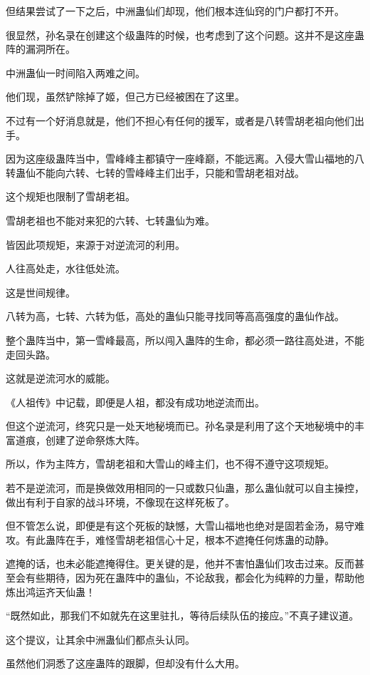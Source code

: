 \begin{this_body}
但结果尝试了一下之后，中洲蛊仙们却现，他们根本连仙窍的门户都打不开。

很显然，孙名录在创建这个级蛊阵的时候，也考虑到了这个问题。这并不是这座蛊阵的漏洞所在。

中洲蛊仙一时间陷入两难之间。

他们现，虽然铲除掉了姬，但己方已经被困在了这里。

不过有一个好消息就是，他们不担心有任何的援军，或者是八转雪胡老祖向他们出手。

因为这座级蛊阵当中，雪峰峰主都镇守一座峰巅，不能远离。入侵大雪山福地的八转蛊仙不能向六转、七转的雪峰峰主们出手，只能和雪胡老祖对战。

这个规矩也限制了雪胡老祖。

雪胡老祖也不能对来犯的六转、七转蛊仙为难。

皆因此项规矩，来源于对逆流河的利用。

人往高处走，水往低处流。

这是世间规律。

八转为高，七转、六转为低，高处的蛊仙只能寻找同等高高强度的蛊仙作战。

整个蛊阵当中，第一雪峰最高，所以闯入蛊阵的生命，都必须一路往高处进，不能走回头路。

这就是逆流河水的威能。

《人祖传》中记载，即便是人祖，都没有成功地逆流而出。

但这个逆流河，终究只是一处天地秘境而已。孙名录是利用了这个天地秘境中的丰富道痕，创建了逆命祭炼大阵。

所以，作为主阵方，雪胡老祖和大雪山的峰主们，也不得不遵守这项规矩。

若不是逆流河，而是换做效用相同的一只或数只仙蛊，那么蛊仙就可以自主操控，做出有利于自家的战斗环境，不像现在这样死板了。

但不管怎么说，即便是有这个死板的缺憾，大雪山福地也绝对是固若金汤，易守难攻。有此蛊阵在手，难怪雪胡老祖信心十足，根本不遮掩任何炼蛊的动静。

遮掩的话，也未必能遮掩得住。更关键的是，他并不害怕蛊仙们攻击过来。反而甚至会有些期待，因为死在蛊阵中的蛊仙，不论敌我，都会化为纯粹的力量，帮助他炼出鸿运齐天仙蛊！

“既然如此，那我们不如就先在这里驻扎，等待后续队伍的接应。”不真子建议道。

这个提议，让其余中洲蛊仙们都点头认同。

虽然他们洞悉了这座蛊阵的跟脚，但却没有什么大用。


\end{this_body}

